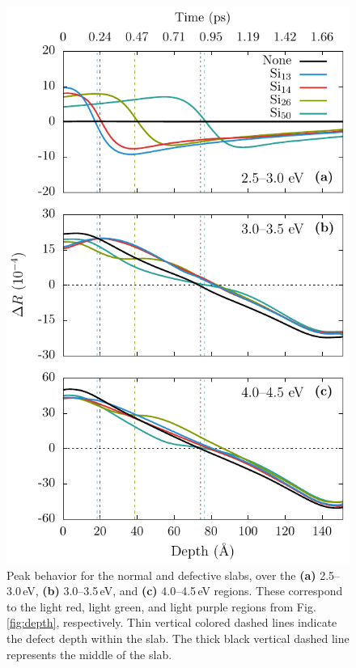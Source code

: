 \documentclass[aps,prb,10pt,showkeys,letterpaper,notitlepage,twocolumn]{revtex4-1}
\begin{document}
\begin{figure}[t]
\includegraphics[width=\linewidth]{fig04}
\caption{Peak behavior for the normal and defective slabs, over the \textbf{(a)}
2.5--3.0\,eV, \textbf{(b)} 3.0--3.5\,eV, and \textbf{(c)} 4.0--4.5\,eV regions.
These correspond to the light red, light green, and light purple regions from
Fig. \ref{fig:depth}, respectively. Thin vertical colored dashed lines indicate
the defect depth within the slab. The thick black vertical dashed line
represents the middle of the slab.}
\label{fig:peaks}
\end{figure}
\end{document}
